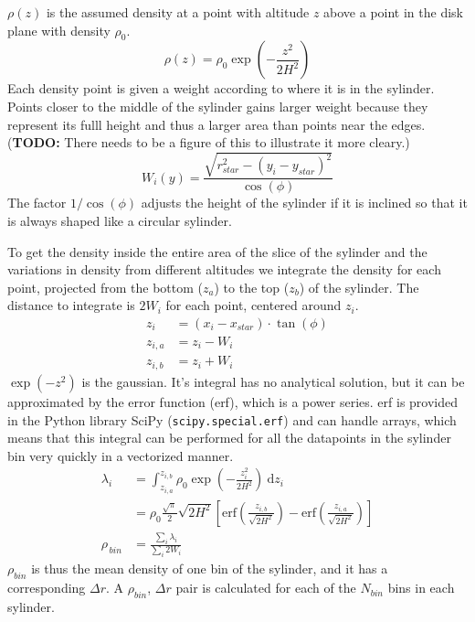 \documentclass[a4paper, 12pt, english, titlepage]{article}
\newcommand{\erf}[1]{\textrm{erf}\left(#1\right)} %
\newcommand{\D}[1]{\ \mathrm{d}#1} %
\begin{document}
    $\rho(z)$ is the assumed density at a point with altitude $z$ above a point in the disk plane with density $\rho_0$.
    $$
    \rho(z) = \rho_0 \exp\left(- \frac{z^2}{2H^2}\right)
    $$
    Each density point is given a weight according to where it is in the sylinder. Points closer to the middle of the sylinder gains larger weight because they represent its fulll height and thus a larger area than points near the edges.
    (\textbf{TODO:} There needs to be a figure of this to illustrate it more cleary.)
    $$
    W_i(y) = \frac{\sqrt{r_{star}^2 - (y_i - y_{star})^2}}{\cos(\phi)}
    $$
    The factor $1/\cos(\phi)$ adjusts the height of the sylinder if it is inclined so that it is always shaped like a circular sylinder.

    To get the density inside the entire area of the slice of the sylinder and the variations in density from different altitudes we integrate the density for each point, projected from the bottom ($z_a$) to the top ($z_b$) of the sylinder. The distance to integrate is $2W_i$ for each point, centered around $z_i$.
    \begin{align*}
        z_i &= (x_i - x_{star}) \cdot \tan(\phi) \\
        z_{i,a} &= z_i - W_i \\
        z_{i,b} &= z_i + W_i
    \end{align*}
    $\exp(-z^2)$ is the gaussian. It's integral has no analytical solution, but it can be approximated by the error function (erf), which is a power series. erf is provided in the Python library SciPy (\texttt{scipy.special.erf}) and can handle arrays, which means that this integral can be performed for all the datapoints in the sylinder bin very quickly in a vectorized manner.
    \begin{align*}
        \lambda_i
        &= \int_{z_{i,a}}^{z_{i,b}} \rho_0 \exp\left(- \frac{z_i^2}{2H^2}\right) \D{z_i} \\
        &= \rho_0 \frac{\sqrt{\pi}}{2} \sqrt{2H^2}
        \left[ \erf{\frac{z_{i,b}}{\sqrt{2H^2}}} - \erf{\frac{z_{i,a}}{\sqrt{2H^2}}} \right] \\
        \rho_{\, bin} &= \frac{\sum_i \lambda_i}{\sum_i 2W_i}
    \end{align*}
    $\rho_{bin}$ is thus the mean density of one bin of the sylinder, and it has a corresponding $\Delta r$. A $\rho_{bin}$, $\Delta r$ pair is calculated for each of the $N_{bin}$ bins in each sylinder.
\end{document}
